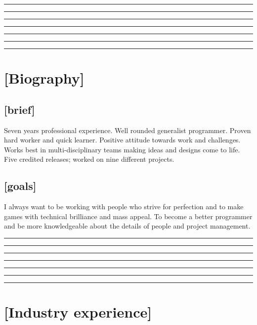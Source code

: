 \documentclass[a4paper]{res}
\newcommand{\setrule}[1]{\rule{#1}{1mm}}
\newcommand{\fibrule}[2]{ \hspace{#1}  \setrule{#2} \setrule{21mm} \setrule{13mm} \setrule{8mm} \setrule{5mm} \setrule{3mm} \setrule{2mm}  \vspace{-.52in} }
\begin{document}
 
\thispagestyle{empty} %
\address{}


\begin{resume}


\fibrule{0.9in}{3.0in}
\section{[Biography]} 

\vspace{-.12in}

\subsection{[brief]}
\mbox{}
\vspace{-.12in}

Seven years professional experience. Well rounded generalist programmer. Proven hard worker and quick learner. Positive attitude towards work and challenges. Works best in multi-disciplinary teams making ideas and designs come to life. Five credited releases; worked on nine different projects.  

\vspace{-.22in}

\subsection{[goals]}
\mbox{}
\vspace{-.12in}

I always want to be working with people who strive for perfection and to make games with technical brilliance and mass appeal. To become a better programmer and be more knowledgeable about the details of people and project management.


\fibrule{2.15in}{1.75in}
\section{[Industry experience]}

\vspace{-.12in}


\end{resume}
\end{document}
